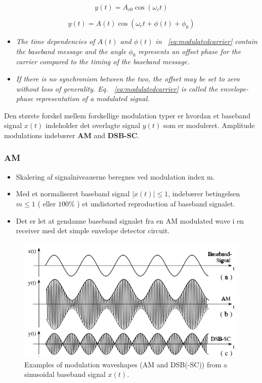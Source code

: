\begin{equation}\label{eq:carrier}
y(t) = A_{c0} \cos(\omega_c t)
\end{equation}

\begin{equation}\label{eq:modulatedcarrier}
y(t) = A(t) \cos(\omega_c t + \phi(t) + \phi_0)
\end{equation}

\begin{itemize}
	\item \textit{The time dependencies of $A(t)$ and $\phi(t)$ in ~\ref{eq:modulatedcarrier} contain the baseband message and the angle $\phi_0$ represents an offset phase for the carrier compared to the timing of the baseband message.} 
	\item \textit{If there is no synchronism between the two, the offset may be set to zero without loss of generality. Eq. ~\ref{eq:modulatedcarrier} is called the envelope-phase representation of a modulated signal.}
\end{itemize}

Den største forskel mellem forskellige modulation typer er hvordan et baseband signal $x(t)$ indeholder det overlagte signal $y(t)$ som er moduleret. Amplitude modulations indebærer \textbf{AM} and \textbf{DSB-SC}.

\subsubsection{AM}
\begin{itemize}
	\item Skalering af signalniveauerne beregnes ved modulation index m.
	\item Med et normaliseret baseband signal $|x(t)|\leq 1$, indebærer betingelsen $m \leq 1$ ( eller $100 \% $ ) et undistorted reproduction af  baseband signalet.
	\item Det er let at gendanne baseband signalet fra en AM modulated wave i en receiver med det simple envelope detector circuit. 
\end{itemize} 

\begin{figure} [H]
	\centering
	\includegraphics[width=\linewidth]{graphics/4.png}
	\caption{Examples of modulation waveshapes (AM and DSB(-SC)) from a sinusoidal baseband signal $x(t)$.}
	\label{fig:4}
\end{figure}

